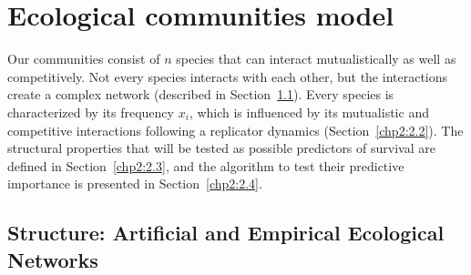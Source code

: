 \section{Ecological communities model}

Our communities consist of $n$ species that can interact mutualistically as well as competitively. Not every species interacts with each other, but the interactions create a complex network (described in Section~\ref{chp2:2.1}). Every species is characterized by its frequency $x_i$, which is influenced by its mutualistic and competitive interactions following a replicator dynamics (Section~\ref{chp2:2.2}). The structural properties that will be tested as possible predictors of survival are defined in Section~\ref{chp2:2.3}, and the algorithm to test their predictive importance is presented in Section~\ref{chp2:2.4}.

\subsection{Structure: Artificial and Empirical Ecological Networks  } \label{chp2:2.1}

